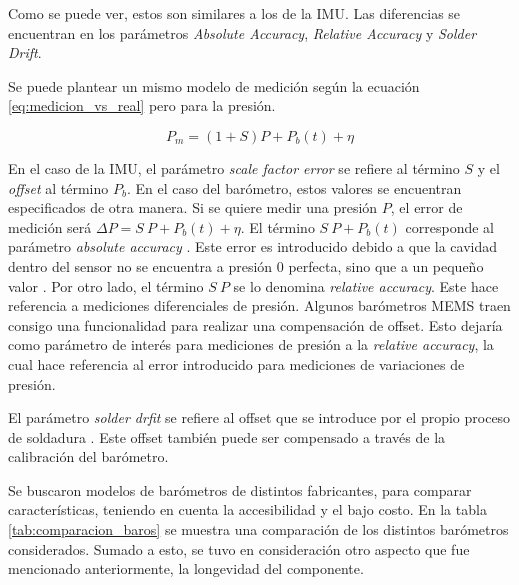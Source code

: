 Como se puede ver, estos son similares a los de la IMU. Las diferencias se encuentran en los parámetros \textit{Absolute Accuracy}, \textit{Relative Accuracy} y \textit{Solder Drift}.

Se puede plantear un mismo modelo de medición según la ecuación \ref{eq:medicion_vs_real} pero para la presión.

\begin{equation}
    P_m = (1+S)P + P_b(t) + \eta
    \label{eq:medicion_presion}
\end{equation}

En el caso de la IMU, el parámetro \textit{scale factor error} se refiere al término $S$ y el \textit{offset} al término $P_b$. En el caso del barómetro, estos valores se encuentran especificados de otra manera. Si se quiere medir una presión $P$, el error de medición será $\Delta P = S \ P + P_b(t) + \eta$. El término $S \ P + P_b(t)$ corresponde al parámetro \textit{absolute accuracy} \cite{baro_4}. Este error es introducido debido a que la cavidad dentro del sensor no se encuentra a presión 0 perfecta, sino que a un pequeño valor \cite{baro_1}. Por otro lado, el término $S \ P$ se lo denomina \textit{relative accuracy}. Este hace referencia a mediciones diferenciales de presión. Algunos barómetros MEMS traen consigo una funcionalidad para realizar una compensación de offset. Esto dejaría como parámetro de interés para mediciones de presión a la \textit{relative accuracy}, la cual hace referencia al error introducido para mediciones de variaciones de presión.

El parámetro \textit{solder drfit} se refiere al offset que se introduce por el propio proceso de soldadura \cite{baro_4}. Este offset también puede ser compensado a través de la calibración del barómetro.

Se buscaron modelos de barómetros de distintos fabricantes, para comparar características, teniendo en cuenta la accesibilidad y el bajo costo. En la tabla \ref{tab:comparacion_baros} se muestra una comparación de los distintos barómetros considerados. Sumado a esto, se tuvo en consideración otro aspecto que fue mencionado anteriormente, la longevidad del componente.

